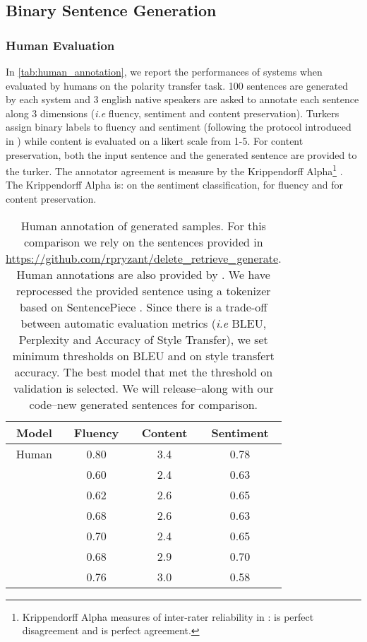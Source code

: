 \subsection{Binary Sentence Generation}



\subsubsection{Human Evaluation} 
In \autoref{tab:human_annotation}, we report the performances of systems when evaluated by humans on the polarity transfer task. 100 sentences are generated by each system and 3 english native speakers are asked to annotate each sentence along 3 dimensions (\textit{i.e} fluency, sentiment and content preservation). Turkers assign binary labels to fluency and sentiment (following the protocol introduced in \citet{jalalzai2020heavy}) while content is evaluated on a likert scale from 1-5. For content preservation, both the input sentence and the generated sentence are provided to the turker. The annotator agreement is measure by the Krippendorff Alpha\footnote{Krippendorff Alpha measures of inter-rater reliability in :  is perfect disagreement and  is perfect agreement.} \cite{krippendorff2018content}. The Krippendorff Alpha is:  on the sentiment classification,  for fluency and  for content preservation.

\begin{table}[t]
\centering
   \begin{tabular}[h]{c|ccc}
   \hline 
   Model &  Fluency & Content & Sentiment\\\hline
Human& 0.80 & 3.4 & 0.78 \\\hline
 & 0.60& 2.4 & 0.63 \\
 & 0.62& 2.6 & 0.65 \\
  & 0.68 & 2.6 &  0.63 \\
 & 0.70 & 2.4 &  0.65  \\
 &0.68 & 2.9 &  0.70  \\
 &0.76& 3.0 &  0.58 \\\hline
\end{tabular}
\caption{Human annotation of generated samples. For this comparison we rely on the sentences provided in \url{https://github.com/rpryzant/delete_retrieve_generate}. Human annotations are also provided by \citet{li2018delete}. We have reprocessed the provided sentence using a tokenizer based on SentencePiece \cite{tok_0,tok_1}. Since there is a trade-off between automatic evaluation metrics (\textit{i.e} BLEU, Perplexity and Accuracy of Style Transfer), we set
minimum thresholds on BLEU and on style transfert accuracy. The best model that met the threshold on validation is selected. We will release--along with our code--new generated sentences for comparison.}
\label{tab:human_annotation}
\end{table}
